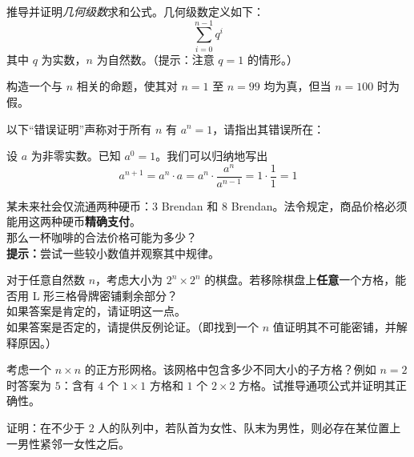 \begin{exercise}
    推导并证明\emph{几何级数}求和公式。几何级数定义如下：
    \[\sum_{i=0}^{n-1}q^i\]
    其中 $q$ 为实数，$n$ 为自然数。（提示：注意 $q = 1$ 的情形。）
\end{exercise}

\begin{exercise}
    构造一个与 $n$ 相关的命题，使其对 $n=1$ 至 $n=99$ 均为真，但当 $n=100$ 时为假。
\end{exercise}

\begin{exercise}
    以下``错误证明''声称对于所有 $n$ 有 $a^n=1$，请指出其错误所在：
    \begin{spoof}
        设 $a$ 为非零实数。已知 $a^0 = 1$。我们可以归纳地写出
        \[a^{n+1} = a^n \cdot a = a^n \cdot \frac{a^n}{a^{n-1}} = 1 \cdot \frac{1}{1} = 1\]
    \end{spoof}
\end{exercise}

\begin{exercise}
    某未来社会仅流通两种硬币：$3$ Brendan 和 $8$ Brendan。法令规定，商品价格必须能用这两种硬币\textbf{精确支付}。\\
    那么一杯咖啡的合法价格可能为多少？\\
    \textbf{提示：}尝试一些较小数值并观察其中规律。
\end{exercise}

\clearpage

\begin{exercise}
    对于任意自然数 $n$，考虑大小为 $2^n \times 2^n$ 的棋盘。若移除棋盘上\textbf{任意}一个方格，能否用 L 形三格骨牌密铺剩余部分？\\
    如果答案是肯定的，请证明这一点。\\
    如果答案是否定的，请提供反例论证。（即找到一个 $n$ 值证明其不可能密铺，并解释原因。）
\end{exercise}

\begin{exercise}
    考虑一个 $n \times n$ 的正方形网格。该网格中包含多少不同大小的子方格？例如 $n=2$ 时答案为 $5$：含有 $4$ 个 $1 \times 1$ 方格和 $1$ 个 $2 \times 2$ 方格。试推导通项公式并证明其正确性。
\end{exercise}

\begin{exercise}
    证明：在不少于 $2$ 人的队列中，若队首为女性、队末为男性，则必存在某位置上一男性紧邻一女性之后。
\end{exercise}

